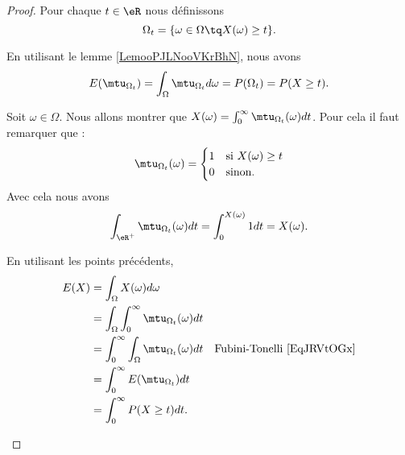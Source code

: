 \begin{proof}
	Pour chaque \( t\in \eR\) nous définissons
	\begin{equation}
		\Omega_t=\{ \omega\in\Omega\tq X(\omega)\geq t \}.
	\end{equation}
	\begin{subproof}
		\spitem[\( P(X\geq t)=E(\mtu_{\Omega_t})\)]
		En utilisant le lemme \ref{LemooPJLNooVKrBhN}, nous avons
		\begin{equation}
			E(\mtu_{\Omega_t})=\int_{\Omega}\mtu_{\Omega_t}d\omega  = P(\Omega_t)  =P(X\geq t).
		\end{equation}

		Soit \( \omega\in \Omega\). Nous allons montrer que \( X(\omega)=\int_0^{\infty}\mtu_{\Omega_t}(\omega)dt\). Pour cela il faut remarquer que :
		\begin{equation}
			\mtu_{\Omega_t}(\omega)=\begin{cases}
				1 & \text{si } X(\omega)\geq t \\
				0 & \text{sinon. }
			\end{cases}
		\end{equation}
		Avec cela nous avons
		\begin{equation}
			\int_{\eR^+}\mtu_{\Omega_t}(\omega)dt=\int_0^{X(\omega)}1dt=X(\omega).
		\end{equation}

		\spitem[Le calcul]
		En utilisant les points précédents,
		\begin{subequations}
			\begin{align}
				E(X) & =\int_{\Omega}X(\omega)d\omega                                                                   \\
				     & =\int_{\Omega}\int_0^{\infty}\mtu_{\Omega_t}(\omega)dt                                           \\
				     & =\int_0^{\infty}\int_{\Omega}\mtu_{\Omega_t}(\omega)dt & \text{Fubini-Tonelli \eqref{EqJRVtOGx}} \\
				     & =\int_0^{\infty}E(\mtu_{\Omega_t})dt                                                             \\
				     & =\int_0^{\infty}P(X\geq t)dt.
			\end{align}
		\end{subequations}
	\end{subproof}
\end{proof}

